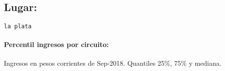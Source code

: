 \documentclass[11pt]{article}
\begin{document}
    
    \hypertarget{lugar}{%
\subsection{Lugar:}\label{lugar}}

    
    \begin{Verbatim}[commandchars=\\\{\}]
la plata

    \end{Verbatim}

    \hypertarget{percentil-ingresos-por-circuito}{%
\paragraph{Percentil ingresos por
circuito:}\label{percentil-ingresos-por-circuito}}

    
    Ingresos en pesos corrientes de Sep-2018. Quantiles 25\%, 75\% y
mediana.

    
    
\end{document}
